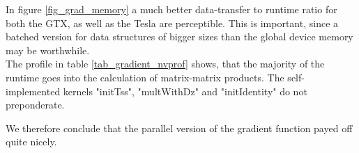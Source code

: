 In figure \ref{fig_grad_memory} a much better data-transfer to runtime ratio for both the GTX, as well as the Tesla are perceptible. This is important, since a batched version for data structures of bigger sizes than the global device memory may be worthwhile. \\

The profile in table  \ref{tab_gradient_nvprof} shows, that the majority of the runtime goes into the calculation of matrix-matrix products. The self-implemented kernels "initTss", "multWithDz" and "initIdentity" do not preponderate.

We therefore conclude that the parallel version of the gradient function payed off quite nicely.